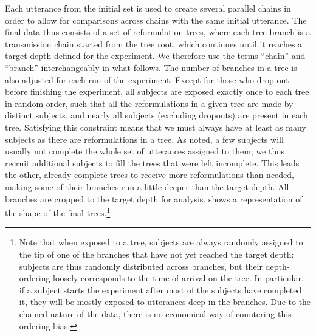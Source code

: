 \documentclass[a4paper,fleqn]{cas-dc}
\begin{document}
Each utterance from the initial set is used to create several parallel
chains in order to allow for comparisons across chains with the same
initial utterance. The final data thus consists of a set of
reformulation trees, where each tree branch is a transmission chain
started from the tree root, which continues until it reaches a target
depth defined for the experiment. We therefore use the terms
  \enquote{chain} and \enquote{branch} interchangeably in what follows.
The number of branches in a tree is also adjusted for each run of the
experiment. Except for those who drop out before finishing the
experiment, all subjects are exposed exactly once to each tree in random
order, such that all the reformulations in a given tree are made by
distinct subjects, and nearly all subjects (excluding dropouts) are
present in each tree. Satisfying this constraint means that we must
always have at least as many subjects as there are reformulations in a
tree. As noted, a few subjects will usually not
complete the whole set of utterances assigned to them; we thus recruit
additional subjects to fill the trees that were left incomplete. This
leads the other, already complete trees to receive more reformulations
than needed, making some of their branches run a little deeper than the
target depth. All branches are cropped to the target depth for analysis.
shows a representation of the shape of the final trees.\footnote{Note that when exposed to a tree, subjects are always randomly
assigned to the tip of one of the branches that have not yet reached the
target depth: subjects are thus randomly distributed across branches,
but their depth-ordering loosely corresponds to the time of arrival on
the tree. In particular, if a subject starts the experiment after most
of the subjects have completed it, they will be mostly exposed to
utterances deep in the branches. Due to the chained nature of the data,
there is no economical way of countering this ordering bias.}

\end{document}
